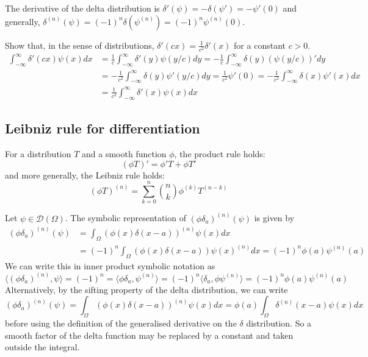 \begin{example}
	The derivative of the delta distribution is $\delta'(\psi) = -\delta(\psi') = -\psi'(0)$ and generally, $\delta^{(n)} (\psi) = {(-1)}^n \delta(\psi^{(n)}) = {(-1)}^n \psi^{(n)} (0)$.
\end{example}

\begin{example}
	Show that, in the sense of distributions, $\delta'(cx) = \frac{1}{c^2} \delta'(x)$ for a constant $c > 0$.
	\[
		\begin{aligned}
			\int_{-\infty}^{\infty} \delta'(cx) \psi(x) dx & = \frac{1}{c} \int_{-\infty}^{\infty} \delta'(y) \psi(y / c) dy = -\frac{1}{c} \int_{-\infty}^{\infty} \delta(y) \left( \psi(y / c) \right)' dy \\
			& = -\frac{1}{c^2} \int_{-\infty}^{\infty} \delta(y) \psi'(y / c) dy = \frac{1}{c^2} \psi'(0) = -\frac{1}{c^2} \int_{-\infty}^{\infty} \delta(x) \psi'(x) dx \\
			& = \frac{1}{c^2} \int_{-\infty}^{\infty} \delta'(x) \psi(x) dx
		\end{aligned}
	\]
\end{example}

\subsection{Leibniz rule for differentiation}

\begin{proposition}
	For a distribution $T$ and a smooth function $\phi$, the product rule holds:
	\[
		(\phi T)' = \phi'T + \phi T'
	\]
	and more generally, the Leibniz rule holds:
	\[
		{(\phi T)}^{(n)} = \sum_{k = 0}^{n} \binom{n}{k} \phi^{(k)} T^{(n - k)}
	\]
\end{proposition}

\begin{example}
	Let $\psi \in \mathcal{D}(\Omega)$. The symbolic representation of ${(\phi \delta_a)}^{(n)} (\psi)$ is given by
	\[
		\begin{aligned}
			{(\phi \delta_a)}^{(n)} (\psi)
				& = \int_{\Omega} {(\phi(x) \delta(x - a))}^{(n)} \psi(x) dx \\
				& = {(-1)}^n \int_{\Omega} (\phi(x) \delta(x - a)) \psi(x)^{(n)} dx = {(-1)}^n \phi(a) \psi^{(n)} (a)
		\end{aligned}
	\]
	We can write this in inner product symbolic notation as
	\[
		\langle {(\phi \delta_a)}^{(n)}, \psi \rangle = {(-1)}^n = \langle \phi \delta_a, \psi^{(n)} \rangle = {(-1)}^n \langle \delta_a, \phi \psi^{(n)} \rangle = {(-1)}^n \phi(a) \psi^{(n)} (a)
	\]
	Alternatively, by the sifting property of the delta distribution, we can write
	\[
		{(\phi \delta_a)}^{(n)} (\psi) = \int_{\Omega} {(\phi(x) \delta(x - a))}^{(n)} \psi(x) dx = \phi(a) \int_{\Omega} \delta^{(n)} (x - a) \psi(x) dx
	\]
	before using the definition of the generalised derivative on the $\delta$ distribution. So a smooth factor of the delta function may be replaced by a constant and taken outside the integral.
\end{example}


